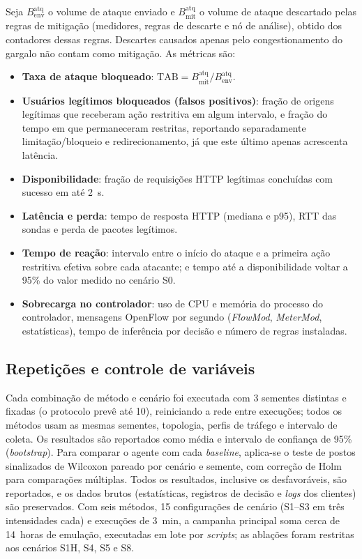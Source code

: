 \documentclass[12pt]{article}
\begin{document}
Seja $B^{\mathrm{atq}}_{\mathrm{env}}$ o volume de ataque enviado e
$B^{\mathrm{atq}}_{\mathrm{mit}}$ o volume de ataque descartado pelas regras de
mitigação (medidores, regras de descarte e nó de análise), obtido dos
contadores dessas regras. Descartes causados apenas pelo congestionamento do
gargalo não contam como mitigação. As métricas são:
\begin{itemize}
  \item \textbf{Taxa de ataque bloqueado}:
        $\mathrm{TAB} = B^{\mathrm{atq}}_{\mathrm{mit}} / B^{\mathrm{atq}}_{\mathrm{env}}$.
  \item \textbf{Usuários legítimos bloqueados (falsos positivos)}: fração de
        origens legítimas que receberam ação restritiva em algum intervalo, e
        fração do tempo em que permaneceram restritas, reportando
        separadamente limitação/bloqueio e redirecionamento, já que este último
        apenas acrescenta latência.
  \item \textbf{Disponibilidade}: fração de requisições HTTP legítimas
        concluídas com sucesso em até 2~s.
  \item \textbf{Latência e perda}: tempo de resposta HTTP (mediana e p95),
        RTT das sondas e perda de pacotes legítimos.
  \item \textbf{Tempo de reação}: intervalo entre o início do ataque e a
        primeira ação restritiva efetiva sobre cada atacante; e tempo até a
        disponibilidade voltar a 95\% do valor medido no cenário S0.
  \item \textbf{Sobrecarga no controlador}: uso de CPU e memória do processo
        do controlador, mensagens OpenFlow por segundo (\textit{FlowMod},
        \textit{MeterMod}, estatísticas), tempo de inferência por decisão e
        número de regras instaladas.
\end{itemize}

\subsection{Repetições e controle de variáveis}

Cada combinação de método e cenário foi executada com 3 sementes distintas e
fixadas (o protocolo prevê até 10), reiniciando a rede entre execuções; todos
os métodos usam as mesmas sementes, topologia, perfis de tráfego e intervalo de
coleta. Os resultados são reportados como média e intervalo de confiança de
95\% (\textit{bootstrap}). Para comparar o agente com cada \textit{baseline},
aplica-se o teste de postos sinalizados de Wilcoxon pareado por cenário e
semente, com correção de Holm para comparações múltiplas. Todos os resultados,
inclusive os desfavoráveis, são reportados, e os dados brutos (estatísticas,
registros de decisão e \textit{logs} dos clientes) são preservados. Com seis
métodos, 15 configurações de cenário (S1--S3 em três intensidades cada) e
execuções de 3~min, a campanha principal soma cerca de 14~horas de emulação,
executadas em lote por \textit{scripts}; as ablações foram restritas aos
cenários S1H, S4, S5 e S8.
\end{document}
